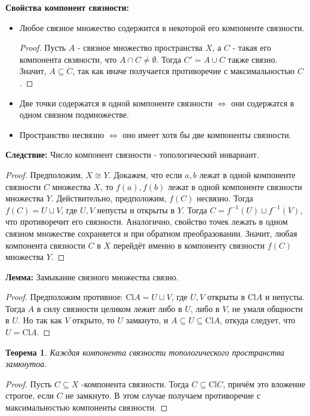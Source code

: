 \documentclass[a4paper,100pt]{article}
\theoremstyle{indented}
\newtheorem{theorem}{Теорема}
\begin{document}
\textbf{Свойства компонент связности:}
\begin{itemize}
    \item Любое связное множество содержится в некоторой его компоненте связности.
    \begin{proof}
    Пусть $A$ - связное множество пространства $X$, а $C$ - такая его компонента свзяности, что $A \cap C \neq \emptyset$. Тогда $C'=A \cup C$ также связно. Значит, $A \subseteq C$, так как иначе получается противоречие с максимальностью $C$.
    \end{proof}
    \item Две точки содержатся в одной компоненте связности $\iff$ они содержатся в одном связном подмножестве.
    \item Пространство несвязно $\iff$ оно имеет хотя бы две компоненты связности.
\end{itemize}
\textbf{Следствие:} Число компонент связности - топологический инвариант.
\begin{proof}
Предположим, $X \cong Y$. Докажем, что если $a, b$ лежат в одной компоненте связности $C$ множества $X$, то $f(a), f(b)$ лежат в одной компоненте связности множества $Y$. Действительно, предположим, $f(C)$ несвязно. Тогда $f(C)=U \sqcup V$, где $U, V$ непусты и открыты в $Y$. Тогда $C=f^{-1}(U) \sqcup f^{-1}(V)$, что противоречит его связности. Аналогично, свойство точек лежать в одном связном множестве сохраняется и при обратном преобразовании. Значит, любая компонента связности $C$ в $X$ перейдёт именно в компоненту связности $f(C)$ множества $Y$.
\end{proof}
\textbf{Лемма:} Замыкание связного множества связно.
\begin{proof}
Предположим противное: $\text{Cl}A=U\sqcup V$, где $U, V$ открыты в $\text{Cl}A$ и непусты. Тогда $A$ в силу связности целиком лежит либо в $U$, либо в $V$, не умаля общности в $U$. Но так как $V$ открыто, то $U$ замкнуто, и $A \subseteq U \subseteq \text{Cl}A $, откуда следует, что $U=\text{Cl}A$.
\end{proof}
\begin{theorem}
Каждая компонента связности топологического пространства замкнутоа.
\end{theorem}
\begin{proof}
Пусть $C \subseteq X$ -компонента связности. Тогда $ C \subseteq \text{Cl} C$, причём это вложение строгое, если $C$ не замкнуто. В этом случае получаем противоречие с максимальностью компоненты связности.
\end{proof}
\end{document}
